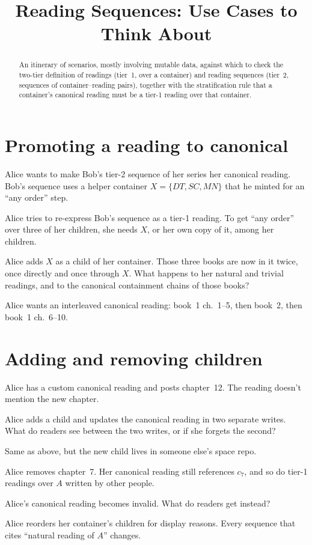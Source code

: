 \documentclass{amsart}
\title{Reading Sequences: Use Cases to Think About}
\begin{document}
\maketitle
\begin{abstract}
An itinerary of scenarios, mostly involving mutable data, against which to check the two-tier definition of readings (tier~1, over a container) and reading sequences (tier~2, sequences of container--reading pairs), together with the stratification rule that a container's canonical reading must be a tier-1 reading over that container.
\end{abstract}

\section{Promoting a reading to canonical}
\begin{todo}
\item Alice wants to make Bob's tier-2 sequence of her series her canonical reading. Bob's sequence uses a helper container $X=\{DT,SC,MN\}$ that he minted for an ``any order'' step.
\item Alice tries to re-express Bob's sequence as a tier-1 reading. To get ``any order'' over three of her children, she needs $X$, or her own copy of it, among her children.
\item Alice adds $X$ as a child of her container. Those three books are now in it twice, once directly and once through $X$. What happens to her natural and trivial readings, and to the canonical containment chains of those books?
\item Alice wants an interleaved canonical reading: book~1 ch.~1--5, then book~2, then book~1 ch.~6--10.
\end{todo}

\section{Adding and removing children}
\begin{todo}
\item Alice has a custom canonical reading and posts chapter~12. The reading doesn't mention the new chapter.
\item Alice adds a child and updates the canonical reading in two separate writes. What do readers see between the two writes, or if she forgets the second?
\item Same as above, but the new child lives in someone else's space repo.
\item Alice removes chapter~7. Her canonical reading still references $c_7$, and so do tier-1 readings over $A$ written by other people.
\item Alice's canonical reading becomes invalid. What do readers get instead?
\item Alice reorders her container's children for display reasons. Every sequence that cites ``natural reading of $A$'' changes.
\end{todo}
\end{document}
